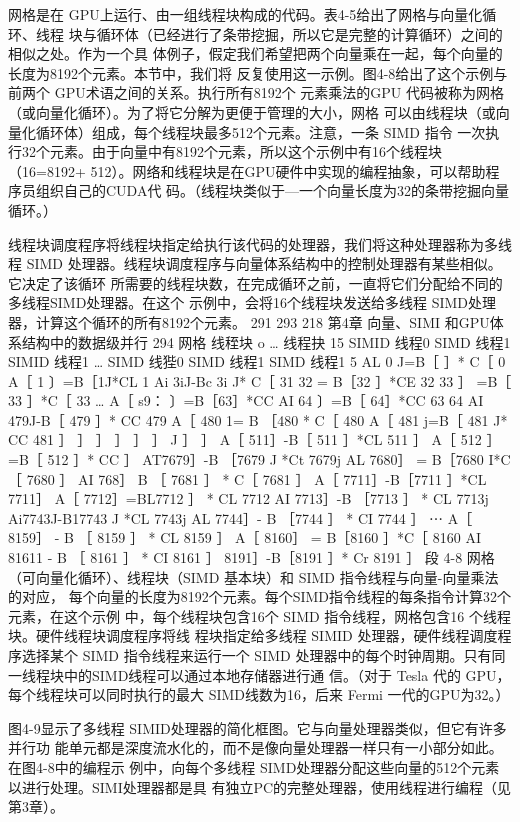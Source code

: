 网格是在 GPU上运行、由一组线程块构成的代码。表4-5给出了网格与向量化循环、线程
块与循环体（已经进行了条带挖掘，所以它是完整的计算循环）之间的相似之处。作为一个具
体例子，假定我们希望把两个向量乘在一起，每个向量的长度为8192个元素。本节中，我们将
反复使用这一示例。图4-8给出了这个示例与前两个 GPU术语之间的关系。执行所有8192个
元素乘法的GPU 代码被称为网格（或向量化循环）。为了将它分解为更便于管理的大小，网格
可以由线程块（或向量化循环体）组成，每个线程块最多512个元素。注意，一条 SIMD 指令
一次执行32个元素。由于向量中有8192个元素，所以这个示例中有16个线程块（16=8192+
512）。网络和线程块是在GPU硬件中实现的编程抽象，可以帮助程序员组织自己的CUDA代
码。（线程块类似于—一个向量长度为32的条带挖掘向量循环。）

线程块调度程序将线程块指定给执行该代码的处理器，我们将这种处理器称为多线程
SIMD 处理器。线程块调度程序与向量体系结构中的控制处理器有某些相似。它决定了该循环
所需要的线程块数，在完成循环之前，一直将它们分配给不同的多线程SIMD处理器。在这个
示例中，会将16个线程块发送给多线程 SIMD处理器，计算这个循环的所有8192个元素。
291
293
218
第4章 向量、SIMI 和GPU体系结构中的数据级并行
294
网格
线秷块
o
…
线程抉
15
SIMID
线程0
SIMD
线程1
SIMID
线程1
…
SIMD
线狴0
SIMD
线程1
SIMD
线程1
5
AL
0
J=B［
］* C［
0
A［
1
〕=B［1J*CL 1
Ai 3iJ-Bc 3i
J* C［ 31
32
= B［32
］*CE
32
33
］
=B［ 33
］*C［
33
…
A［
s9：
〕=B［63］*CC
AI
64
〕=B［ 64］*CC
63
64
AI 479J-B［ 479
］* CC 479
A［ 480 1=
B
［480
* C［
480
A［
481 j=B［ 481
J* CC 481
］
］
］
］
］
］
J
］
］
A［ 511］-B［ 511 ］*CL 511 ］
A［
512 ］=B［ 512
］* CC
］
AT7679］-B ［7679 J *Ct 7679j
AL 7680］
= B［7680
I*C［ 7680
］
AI
768］
B ［ 7681 ］ * C［ 7681
］
A［ 7711］-B［7711 ］*CL 7711］
A［ 7712］=BL7712 ］ * CL 7712
AI 7713］-B ［7713 ］ * CL 7713j
Ai7743J-B17743 J *CL 7743j
AL 7744］- B ［7744 ］ * CI 7744 ］
⋯
A［ 8159］ - B ［ 8159 ］ * CL 8159 ］
A［ 8160］
= B［8160 ］*C［ 8160
AI 81611 - B ［ 8161 ］ * CI 8161
］
8191］-B［8191 ］* Cr 8191
］
段 4-8
网格（可向量化循环）、线程块（SIMD 基本块）和 SIMD 指令线程与向量-向量乘法的对应，
每个向量的长度为8192个元素。每个SIMD指令线程的每条指令计算32个元素，在这个示例
中，每个线程块包含16个 SIMD 指令线程，网格包含16 个线程块。硬件线程块调度程序将线
程块指定给多线程 SIMID 处理器，硬件线程调度程序选择某个 SIMD 指令线程来运行一个
SIMD 处理器中的每个时钟周期。只有同一线程块中的SIMD线程可以通过本地存储器进行通
信。（对于 Tesla 代的 GPU，每个线程块可以同时执行的最大 SIMD线数为16，后来 Fermi
一代的GPU为32。）

图4-9显示了多线程 SIMID处理器的简化框图。它与向量处理器类似，但它有许多并行功
能单元都是深度流水化的，而不是像向量处理器一样只有一小部分如此。在图4-8中的编程示
例中，向每个多线程 SIMD处理器分配这些向量的512个元素以进行处理。SIMI处理器都是具
有独立PC的完整处理器，使用线程进行编程（见第3章）。

